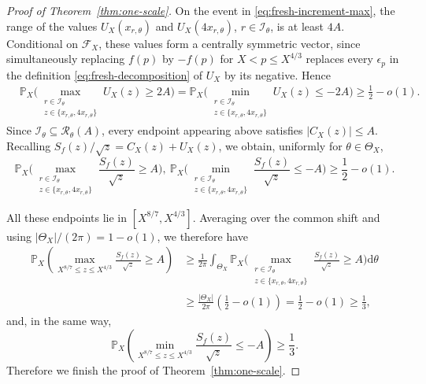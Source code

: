 \documentclass[a4paper,12pt,reqno]{amsart}
\numberwithin{equation}{section}
\theoremstyle{remark}
\newcommand{\p}{\mathbb{P}}
\begin{document}
\begin{proof}[Proof of Theorem~\ref{thm:one-scale}]
On the event in \eqref{eq:fresh-increment-max}, the range of the values
\(U_X(x_{r,\theta})\) and \(U_X(4x_{r,\theta})\),
\(r\in\mathcal I_\theta\), is at least \(4A\).
 Conditional on \(\mathscr F_X\), these values form a centrally symmetric
vector, since simultaneously replacing \(f(p)\) by \(-f(p)\) for
\(X<p\leq X^{4/3}\) replaces every $\epsilon_p$ in the definition \eqref{eq:fresh-decomposition} of $U_X$ by its negative. Hence
\[
 \begin{aligned}
 &\p_X\bigg(
 \max_{\substack{r\in\mathcal I_\theta\\
 z\in\{x_{r,\theta},4x_{r,\theta}\}}}
 U_X(z)\geq2A
 \bigg)=
 \p_X\bigg(
 \min_{\substack{r\in\mathcal I_\theta\\
 z\in\{x_{r,\theta},4x_{r,\theta}\}}}
 U_X(z)\leq-2A
 \bigg)
 \geq\frac12-o(1).
 \end{aligned}
\]
Since
\(\mathcal I_\theta\subseteq\mathcal R_\theta(A)\), every endpoint
appearing above satisfies \(|C_X(z)|\leq A\). Recalling
\(S_f(z)/\sqrt z=C_X(z)+U_X(z)\), we obtain, uniformly for
\(\theta\in\Theta_X\),
\[
 \p_X\bigg(
 \max_{\substack{r\in\mathcal I_\theta\\
 z\in\{x_{r,\theta},4x_{r,\theta}\}}}
 \frac{S_f(z)}{\sqrt z}\geq A
 \bigg),\ 
 \p_X\bigg(
 \min_{\substack{r\in\mathcal I_\theta\\
 z\in\{x_{r,\theta},4x_{r,\theta}\}}}
 \frac{S_f(z)}{\sqrt z}\leq-A
 \bigg)
 \geq\frac12-o(1).
\]

All these endpoints lie in \([X^{8/7},X^{4/3}]\). Averaging over the
common shift and using \(|\Theta_X|/(2\pi)=1-o(1)\), we therefore have
\[
 \begin{aligned}
 \p_X\left(
 \max_{X^{8/7}\leq z\leq X^{4/3}}
 \frac{S_f(z)}{\sqrt z}\geq A
 \right)
 &\geq
 \frac1{2\pi}\int_{\Theta_X}
 \p_X\bigg(
 \max_{\substack{r\in\mathcal I_\theta\\
 z\in\{x_{r,\theta},4x_{r,\theta}\}}}
 \frac{S_f(z)}{\sqrt z}\geq A
 \bigg)\mathrm{d}\theta\\
 &\geq
 \frac{|\Theta_X|}{2\pi}
 \left(\frac12-o(1)\right)
 =
 \frac12-o(1)\ge \frac13,
 \end{aligned}
\]
and, in the same way,
\[
 \p_X\left(
 \min_{X^{8/7}\leq z\leq X^{4/3}}
 \frac{S_f(z)}{\sqrt z}\leq-A
 \right)
 \geq\frac13.
\]
Therefore we finish the proof of Theorem~\ref{thm:one-scale}.
\end{proof}










\end{document}
